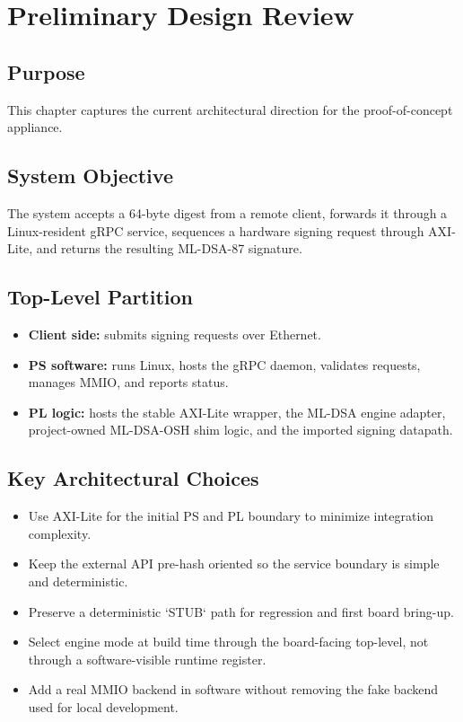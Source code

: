 \chapter{Preliminary Design Review}

\section*{Purpose}
This chapter captures the current architectural direction for the proof-of-concept appliance.

\section{System Objective}
The system accepts a 64-byte digest from a remote client, forwards it through a Linux-resident gRPC service, sequences a hardware signing request through AXI-Lite, and returns the resulting ML-DSA-87 signature.

\section{Top-Level Partition}
\begin{itemize}[leftmargin=*]
  \item \textbf{Client side:} submits signing requests over Ethernet.
  \item \textbf{PS software:} runs Linux, hosts the gRPC daemon, validates requests, manages MMIO, and reports status.
  \item \textbf{PL logic:} hosts the stable AXI-Lite wrapper, the ML-DSA engine adapter, project-owned ML-DSA-OSH shim logic, and the imported signing datapath.
\end{itemize}

\section{Key Architectural Choices}
\begin{itemize}[leftmargin=*]
  \item Use AXI-Lite for the initial PS and PL boundary to minimize integration complexity.
  \item Keep the external API pre-hash oriented so the service boundary is simple and deterministic.
  \item Preserve a deterministic `STUB` path for regression and first board bring-up.
  \item Select engine mode at build time through the board-facing top-level, not through a software-visible runtime register.
  \item Add a real MMIO backend in software without removing the fake backend used for local development.
\end{itemize}

